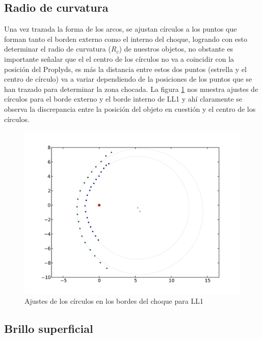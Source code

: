 \documentclass{article}
\begin{document}
\subsection{Radio de curvatura}
\label{sec:curvatura}

Una vez trazada la forma de los arcos, se ajustan círculos a los puntos que forman tanto el borden externo como el interno del choque, logrando con esto determinar el radio de curvatura (\(R_{c}\)) de nuestros objetos, no obstante es importante señalar que el el centro de los círculos no va a coincidir con la posición del Proplyds, es más la distancia entre estos dos puntos (estrella y el centro de círculo)  va a variar dependiendo de la posiciones de los puntos que se han trazado para determinar la zona chocada. La figura \ref{fig:ajuste-circulo} nos muestra ajustes de círculos para el borde externo y el borde interno de LL1 y ahí claramente se observa la discrepancia entre la posición del objeto en cuestión y el centro de los círculos.\\

\begin{figure}
  \centering
  \includegraphics[width=.8\linewidth]{j8oc01010_wcs/LL1-arcfits.pdf}
  \caption{Ajustes de los círculos en los bordes del choque para LL1}
  \label{fig:ajuste-circulo}
\end{figure}

\subsection{Brillo superficial}
\label{sec:brillo}
\end{document}
